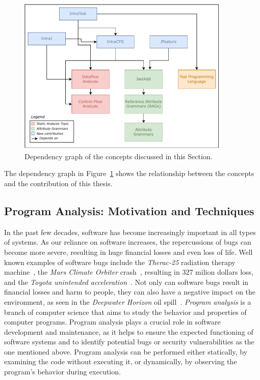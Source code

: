 \usetikzlibrary{backgrounds}
\begin{figure}[h]
    \centering
    \includegraphics[width=0.9\textwidth]{kappa/img/Dependencies.pdf}
  \caption{\label{fig:dependencygraph}Dependency graph of the concepts discussed in this Section.}
\end{figure}
The dependency graph in Figure~\ref{fig:dependencygraph} shows the relationship between
the concepts and the contribution of this thesis.

\subsection{Program Analysis: Motivation and Techniques}
In the past few decades, software has become increasingly important in all types of systems.
As our reliance on software increases, the repercussions of bugs can become more severe,
resulting in huge financial losses and even loss of life.
Well known examples of software bugs include the \emph{Therac-25} radiation therapy machine~\cite{leveson1993investigation},
the \emph{Mars Climate Orbiter} crash~\cite{Sawyer1999}, resulting in 327 milion dollars loss, and the \emph{Toyota unintended acceleration}~\cite{kane2010toyota}.
Not only can software bugs result in financial losses and harm to people,
they can also have a negative impact on the environment, as seen in the \emph{Deepwater Horizon} oil spill~\cite{Shafer2010Oil}.
\emph{Program analysis} is a branch of computer science that aims to study the behavior
and properties of computer programs. Program analysis plays a crucial role in software
development and maintenance, as it helps to ensure the expected functioning of software
systems and to identify potential bugs or security vulnerabilities as the one mentioned above.
Program analysis can be performed either statically, by examining the code without executing it,
or dynamically, by observing the program's behavior during execution.



